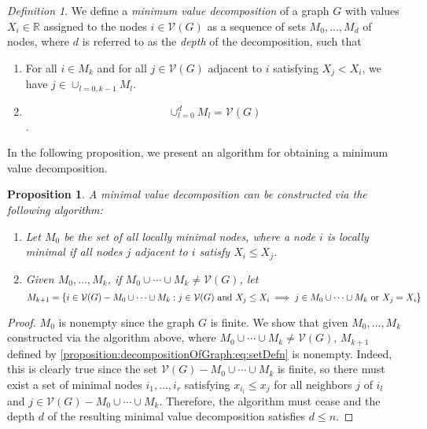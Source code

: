 \documentclass{article}
\newtheorem{proposition}{Proposition}
\theoremstyle{remark}
\newtheorem{definition}{Definition}
\newcommand{\R}[0]{\mathbb{R}}
\begin{document}
\begin{definition}{\label{defn:minDecomposition}}
	We define a \textit{minimum value decomposition} of a graph $G$ with values $X_i\in\R$ assigned to the nodes $i\in\mathcal{V}(G)$ as a sequence of sets $M_0,\ldots,M_d$ of nodes, where $d$ is referred to as the \textit{depth} of the decomposition, such that
	\begin{enumerate}
		\item For all $i\in M_k$ and for all $j\in\mathcal{V}(G)$ adjacent to $i$ satisfying $X_j<X_i$, we have $j\in\cup_{l=0,k-1}M_l$.
		\item \begin{equation}\cup_{l=0}^d M_l=\mathcal{V}(G)\end{equation}.
	\end{enumerate}
\end{definition}
In the following proposition, we present an algorithm for obtaining a minimum value decomposition.
\begin{proposition}{\label{proposition:decompositionOfGraph}}
	A minimal value decomposition can be constructed via the following algorithm:
	\begin{enumerate}
		\item Let $M_0$ be the set of all locally minimal nodes, where a node $i$ is locally minimal if all nodes $j$ adjacent to $i$ satisfy $X_i\leq X_j$.
		\item Given $M_0,\ldots,M_k$, if $M_0\cup\cdots\cup M_k\neq\mathcal{V}(G)$, let
			\begin{equation}{\label{proposition:decompositionOfGraph:eq:setDefn}}
				M_{k+1}=\left\{i\in\mathcal{V}(G)-M_0\cup\cdots\cup M_k: j\in\mathcal{V}(G)\text{ and } X_j\leq X_i \implies j\in M_0\cup\cdots\cup M_k\text{ or } X_j=X_i\right\}
			\end{equation}
	\end{enumerate}
\end{proposition}
\begin{proof}
	$M_0$ is nonempty since the graph $G$ is finite. We show that given $M_0,\ldots,M_k$ constructed via the algorithm above, where $M_0\cup\cdots\cup M_k\neq \mathcal{V}(G)$, $M_{k+1}$ defined by \eqref{proposition:decompositionOfGraph:eq:setDefn} is nonempty. Indeed, this is clearly true since the set $\mathcal{V}(G)-M_0\cup\cdots\cup M_k$ is finite, so there must exist a set of minimal nodes $i_1,\ldots,i_r$ satisfying $x_{i_l}\leq x_{j}$ for all neighbors $j$ of $i_l$ and $j\in\mathcal{V}(G)-M_0\cup\cdots\cup M_k$. Therefore, the algorithm must cease and the depth $d$ of the resulting minimal value decomposition satisfies $d\leq n$.
\end{proof}
\end{document}
